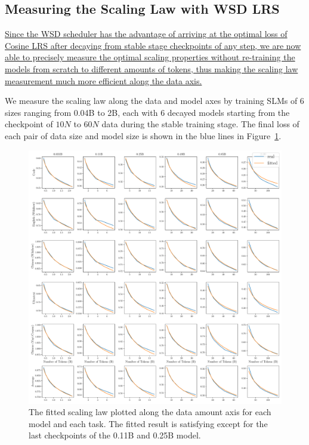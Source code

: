 \subsection{Measuring the Scaling Law with WSD LRS}
\label{scalinglawwsdlrs}

\uline{Since the WSD scheduler has the advantage of arriving at the optimal loss of Cosine LRS after decaying from stable stage checkpoints of any step, we are now able to precisely measure the optimal scaling properties without re-training the models from scratch to different amounts of tokens, thus making the scaling law measurement much more efficient along the data axis.}

We measure the scaling law along the data and model axes by training SLMs of 6 sizes ranging from 0.04B to 2B, each with 6 decayed models starting from the checkpoint of $10N$ to $60N$ data during the stable training stage. The final loss of each pair of data size and model size is shown in the blue lines in Figure~\ref{fig:individual_task_datascalinglaw}.

\begin{figure}
    \centering
    \includegraphics[width=1.0\textwidth]{Fig/individual_task_datascalinglaw.pdf}
    \caption{The fitted scaling law plotted along the data amount axis for each model and each task. The fitted result is satisfying except for the last checkpoints of the 0.11B and 0.25B model. }
    \label{fig:individual_task_datascalinglaw}
\end{figure}

